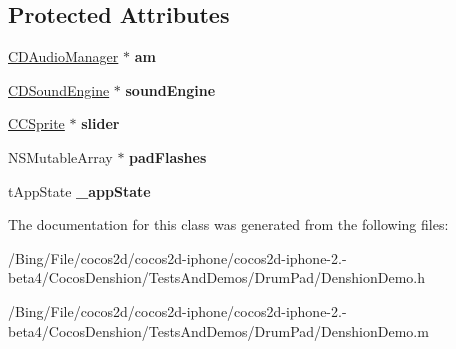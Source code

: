\subsection*{Protected Attributes}
\begin{DoxyCompactItemize}
\item 
\hypertarget{interface_denshion_layer_abf40d37475c661f003071831ef56eb1e}{\hyperlink{interface_c_d_audio_manager}{C\-D\-Audio\-Manager} $\ast$ {\bfseries am}}\label{interface_denshion_layer_abf40d37475c661f003071831ef56eb1e}

\item 
\hypertarget{interface_denshion_layer_af07fe4a86018f7d59e68d786796ba090}{\hyperlink{interface_c_d_sound_engine}{C\-D\-Sound\-Engine} $\ast$ {\bfseries sound\-Engine}}\label{interface_denshion_layer_af07fe4a86018f7d59e68d786796ba090}

\item 
\hypertarget{interface_denshion_layer_ae158bf8141ff6be03c733d4f09004324}{\hyperlink{class_c_c_sprite}{C\-C\-Sprite} $\ast$ {\bfseries slider}}\label{interface_denshion_layer_ae158bf8141ff6be03c733d4f09004324}

\item 
\hypertarget{interface_denshion_layer_a3be76b36c7ce824d82ef2d03bded40ae}{N\-S\-Mutable\-Array $\ast$ {\bfseries pad\-Flashes}}\label{interface_denshion_layer_a3be76b36c7ce824d82ef2d03bded40ae}

\item 
\hypertarget{interface_denshion_layer_abea0cd409e297e7dcec2051bda3e63ff}{t\-App\-State {\bfseries \-\_\-app\-State}}\label{interface_denshion_layer_abea0cd409e297e7dcec2051bda3e63ff}

\end{DoxyCompactItemize}


The documentation for this class was generated from the following files\-:\begin{DoxyCompactItemize}
\item 
/\-Bing/\-File/cocos2d/cocos2d-\/iphone/cocos2d-\/iphone-\/2.-\/beta4/\-Cocos\-Denshion/\-Tests\-And\-Demos/\-Drum\-Pad/Denshion\-Demo.\-h\item 
/\-Bing/\-File/cocos2d/cocos2d-\/iphone/cocos2d-\/iphone-\/2.-\/beta4/\-Cocos\-Denshion/\-Tests\-And\-Demos/\-Drum\-Pad/Denshion\-Demo.\-m\end{DoxyCompactItemize}
